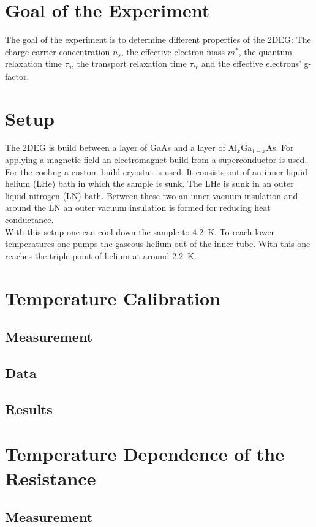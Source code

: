 \documentclass[12pt,a4paper]{article}
\begin{document}
\section{Goal of the Experiment}
The goal of the experiment is to determine different properties of the 2DEG: The charge carrier concentration $n_s$, the effective electron mass $m^*$, the quantum relaxation time $\tau _q$, the transport relaxation time $\tau _{tr}$ and the effective electrons' g-factor.


\section{Setup}
The 2DEG is build between a layer of GaAs and a layer of Al$_{x}$Ga$_{1-x}$As. For applying a magnetic field an electromagnet build from a superconductor is used. For the cooling a custom build cryostat is used. It consists out of an inner liquid helium (LHe) bath in which the sample is sunk. The LHe is sunk in an outer liquid nitrogen (LN) bath. Between these two an inner vacuum insulation and around the LN an outer vacuum insulation is formed for reducing heat conductance. \\
With this setup one can cool down the sample to \SI{4.2}{K}. To reach lower temperatures one pumps the gaseous helium out of the inner tube. With this one reaches the triple point of helium at around \SI{2.2}{K}.


\section{Temperature Calibration}
\subsection{Measurement}

\subsection{Data}

\subsection{Results}


\section{Temperature Dependence of the Resistance}
\subsection{Measurement}
\end{document}
